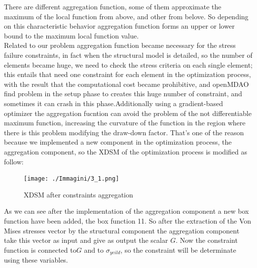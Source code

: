 There are different aggregation function, some of them approximate the maximum of the local function from above, and other from belove. So depending on this characteristic behavior aggregation function forms an upper or lower bound to the maximum local function value.\\
Related to our problem aggregation function became necessary for the stress failure constraints, in fact when the structural model is detailed, so the number of elements became huge, we need to check the stress criteria on each single element; this entails that need one constraint for each element in the optimization process, with the result that the computational cost became prohibitive, and openMDAO find problem in the setup phase to creates this huge number of constraint, and sometimes it can crash in this phase.Additionally using a gradient-based optimizer the aggregation fucntion can avoid the problem of the not differentiable maximum function, increasing the curvature of the function in the region where there is this problem modifying the draw-down factor. That's one of the reason because we implemented a new component in the optimization process, the aggregation component, so the XDSM of the optimization process is modified as follow:
\begin{figure}[H]
	\centering
	\texttt{[image: ./Immagini/3\_1.png]}
	\caption{XDSM after constraints aggregation}
	\label{fig:3_1}
\end{figure}
As we can see after the implementation of the aggregation component a new box function have been added, the box function 11. So after the extraction of the Von Mises stresses vector by the structural component the aggregation component take this vector as input and give as output the scalar $G$. Now the constraint function is connected to$G$ and to $\sigma_{yeild}$, so the constraint will be determinate using these variables.
